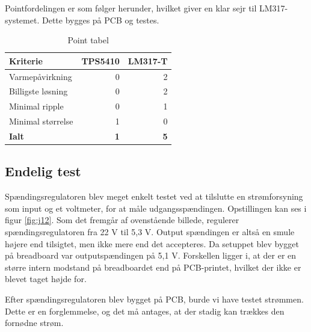 Pointfordelingen er som følger herunder, hvilket giver en klar sejr til LM317-systemet. Dette bygges på PCB og testes.
\begin{table}[h]
  \centering
\begin{tabular}{lrr}
\textbf{Kriterie} & \textbf{TPS5410} & \textbf{LM317-T} \\
\hline
Varmepåvirkning & 0 & 2 \\
Billigste løsning & 0 & 2 \\
Minimal ripple & 0 & 1 \\
Minimal størrelse & 1 & 0 \\
\hline
\textbf{Ialt} & \textbf{1} & \textbf{5} \\
\end{tabular}
  \caption{Point tabel}
  \label{tab:pointj}
\end{table}

\subsection{Endelig test}
\label{sec:endelig-test}

Spændingsregulatoren blev meget enkelt testet ved at tilslutte en strømforsyning som input og et voltmeter, for at måle udgangsspændingen. Opstillingen kan ses i figur \ref{fig:j12}. Som det fremgår af ovenstående billede, regulerer spændingsregulatoren fra 22 V til 5,3 V. Output spændingen er altså en smule højere end tilsigtet, men ikke mere end det accepteres. Da setuppet blev bygget på breadboard var outputspændingen på 5,1 V. Forskellen ligger i, at der er en større intern modstand på breadboardet end på PCB-printet, hvilket der ikke er blevet taget højde for. 

Efter spændingsregulatoren blev bygget på PCB, burde vi have testet strømmen. Dette er en forglemmelse, og det må antages, at der stadig kan trækkes den fornødne strøm. 

